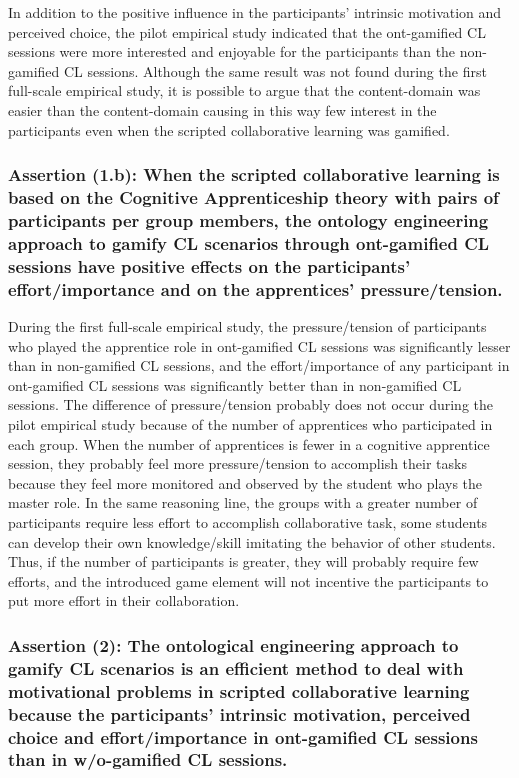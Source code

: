 In addition to the positive influence in the participants' intrinsic motivation and perceived choice, the pilot empirical study indicated that the ont-gamified CL sessions were more interested and enjoyable for the participants than the non-gamified CL sessions.
Although the same result was not found during the first full-scale empirical study, it is possible to argue that the content-domain  was easier than the content-domain  causing in this way few interest in the participants even when the scripted collaborative learning was gamified.

\subsubsection*{Assertion (1.b): When the scripted collaborative learning is based on the Cognitive Apprenticeship theory with pairs of participants per group members, the ontology engineering approach to gamify CL scenarios through ont-gamified CL sessions have positive effects on the participants' effort/importance and on the apprentices' pressure/tension.}

During the first full-scale empirical study, the pressure/tension of participants who played the apprentice role in ont-gamified CL sessions was significantly lesser than in non-gamified CL sessions, and the effort/importance of any participant in ont-gamified CL sessions was significantly better than in non-gamified CL sessions.
The difference of pressure/tension probably does not occur during the pilot empirical study because of the number of apprentices who participated in each group.
When the number of apprentices is fewer in a cognitive apprentice session, they probably feel more pressure/tension to accomplish their tasks because they feel more monitored and observed by the student who plays the master role. 
In the same reasoning line, the groups with a greater number of participants require less effort to accomplish collaborative task, some students can develop their own knowledge/skill imitating the behavior of other students.
Thus, if the number of participants is greater, they will probably require few efforts, and the introduced game element will not incentive the participants to put more effort in their collaboration.

\subsubsection*{Assertion (2): The ontological engineering approach to gamify CL scenarios is an efficient method to deal with motivational problems in scripted collaborative learning because the participants' intrinsic motivation, perceived choice and effort/importance in ont-gamified CL sessions than in w/o-gamified CL sessions.}


